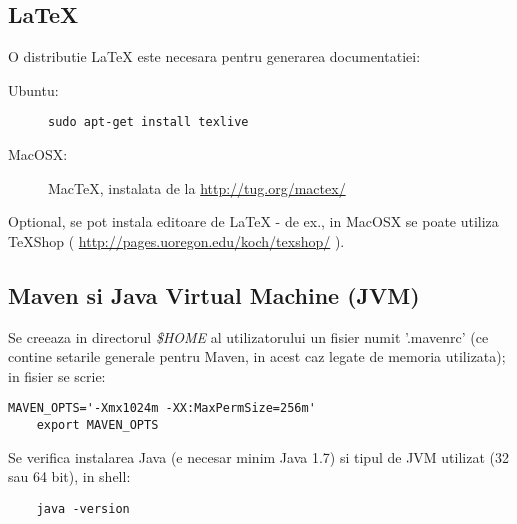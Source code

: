 \subsection{LaTeX}
O distributie LaTeX este necesara pentru generarea documentatiei:

\begin{description}
\item[Ubuntu:] 
\begin{lstlisting}[breaklines=true]
	sudo apt-get install texlive
\end{lstlisting}
\item[MacOSX:] 
MacTeX, instalata de la \url{http://tug.org/mactex/} 
\end{description}

Optional, se pot instala editoare de LaTeX - de ex., 
in MacOSX  se poate utiliza TeXShop 
( \url{http://pages.uoregon.edu/koch/texshop/} ).

\subsection{Maven si Java Virtual Machine (JVM)}
Se creeaza in directorul \emph{\$HOME} al utilizatorului un fisier numit
'.mavenrc' 
(ce contine setarile generale pentru Maven, in acest caz legate de memoria utilizata);
in fisier se scrie:
\begin{lstlisting}[breaklines=true]
	MAVEN_OPTS='-Xmx1024m -XX:MaxPermSize=256m'
	export MAVEN_OPTS
\end{lstlisting}

\label{java_version}
Se verifica instalarea Java (e necesar minim Java 1.7) si tipul de JVM
utilizat (32 sau 64 bit), in shell:
\begin{lstlisting}
	java -version
\end{lstlisting}

\begin{comment}
\subsection{Perl si Selenium}
\paragraph{In MacOSX:}
Se instaleaza modulul Selenium din Perl, cu urmatoarele comenzi in shell si apoi in shell-ul CPAN
(se alege in timpul instalarii site-mirror-ul folosit;
se iese la final din shell-ul CPAN cu Ctrl+D):
\begin{lstlisting}
	sudo /usr/bin/cpan
		install Test::WWW::Selenium
\end{lstlisting}
\end{comment}


